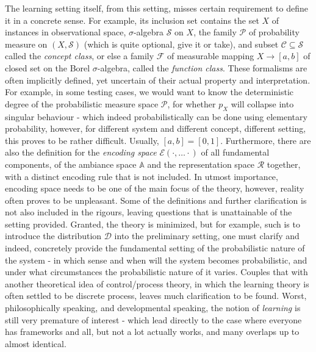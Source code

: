 The learning setting itself, from this setting, misses certain requirement to define it in a concrete sense. For example, its inclusion set contains the set $X$ of instances in observational space, $\sigma$-algebra $\mathcal{S}$ on $X$, the family $\mathcal{P}$ of probability measure on $(X,\mathcal{S})$ (which is quite optional, give it or take), and subset $\mathcal{C}\subseteq \mathcal{S}$ called the \textit{concept class}, or else a family $\mathcal{F}$ of measurable mapping $X\to [a,b]$ of closed set on the Borel $\sigma$-algebra, called the \textit{function class}. These formalisms are often implicitly defined, yet uncertain of their actual property and interpretation. For example, in some testing cases, we would want to know the deterministic degree of the probabilistic measure space $\mathcal{P}$, for whether $p_{X}$ will collapse into singular behaviour - which indeed probabilistically can be done using elementary probability, however, for different system and different concept, different setting, this proves to be rather difficult. Usually, $[a,b]=[0,1]$. Furthermore, there are also the definition for the \textit{encoding space} $\mathcal{E}(\cdot,\dots\cdot)$ of all fundamental components, of the ambiance space $\mathbb{A}$ and the representation space $\mathcal{R}$ together, with a distinct encoding rule that is not included. In utmost importance, encoding space needs to be one of the main focus of the theory, however, reality often proves to be unpleasant. Some of the definitions and further clarification is not also included in the rigours, leaving questions that is unattainable of the setting provided. Granted, the theory is minimized, but for example, such is to introduce the distribution $\mathcal{D}$ into the preliminary setting, one must clarify and indeed, concretely provide the fundamental setting of the probabilistic nature of the system - in which sense and when will the system becomes probabilistic, and under what circumstances the probabilistic nature of it varies. Couples that with another theoretical idea of control/process theory, in which the learning theory is often settled to be discrete process, leaves much clarification to be found. Worst, philosophically speaking, and developmental speaking, the notion of \textit{learning} is still very premature of interest - which lead directly to the case where everyone has frameworks and all, but not a lot actually works, and many overlaps up to almost identical. 

